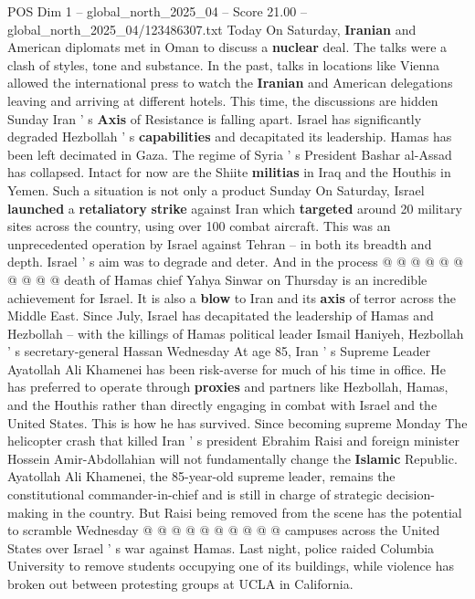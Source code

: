\begin{textsample}{POS Dim 1 – global\_north\_2025\_04 – Score 21.00 – global\_north\_2025\_04/123486307.txt}  \label{ex:f1_pos_411}
Today On Saturday, \textbf{Iranian} and American diplomats met in Oman to discuss a \textbf{nuclear} deal.
The talks were a clash of styles, tone and substance.
In the past, talks in locations like Vienna allowed the international press to watch the \textbf{Iranian} and American delegations leaving and arriving at different hotels.
This time, the discussions are hidden Sunday Iran ' s \textbf{Axis} of Resistance is falling apart.
Israel has significantly degraded Hezbollah ' s \textbf{capabilities} and decapitated its leadership.
Hamas has been left decimated in Gaza.
The regime of Syria ' s President Bashar al-Assad has collapsed.
Intact for now are the Shiite \textbf{militias} in Iraq and the Houthis in Yemen.
Such a situation is not only a product Sunday On Saturday, Israel \textbf{launched} a \textbf{retaliatory} \textbf{strike} against Iran which \textbf{targeted} around 20 military sites across the country, using over 100 combat aircraft.
This was an unprecedented operation by Israel against Tehran -- in both its breadth and depth.
Israel ' s aim was to degrade and deter.
And in the process @ @ @ @ @ @ @ @ @ @ death of Hamas chief Yahya Sinwar on Thursday is an incredible achievement for Israel.
It is also a \textbf{blow} to Iran and its \textbf{axis} of terror across the Middle East.
Since July, Israel has decapitated the leadership of Hamas and Hezbollah -- with the killings of Hamas political leader Ismail Haniyeh, Hezbollah ' s secretary-general Hassan Wednesday At age 85, Iran ' s Supreme Leader Ayatollah Ali Khamenei has been risk-averse for much of his time in office.
He has preferred to operate through \textbf{proxies} and partners like Hezbollah, Hamas, and the Houthis rather than directly engaging in combat with Israel and the United States.
This is how he has survived.
Since becoming supreme Monday The helicopter crash that killed Iran ' s president Ebrahim Raisi and foreign minister Hossein Amir-Abdollahian will not fundamentally change the \textbf{Islamic} Republic.
Ayatollah Ali Khamenei, the 85-year-old supreme leader, remains the constitutional commander-in-chief and is still in charge of strategic decision-making in the country.
But Raisi being removed from the scene has the potential to scramble Wednesday @ @ @ @ @ @ @ @ @ @ campuses across the United States over Israel ' s war against Hamas.
Last night, police raided Columbia University to remove students occupying one of its buildings, while violence has broken out between protesting groups at UCLA in California.

\end{textsample}
